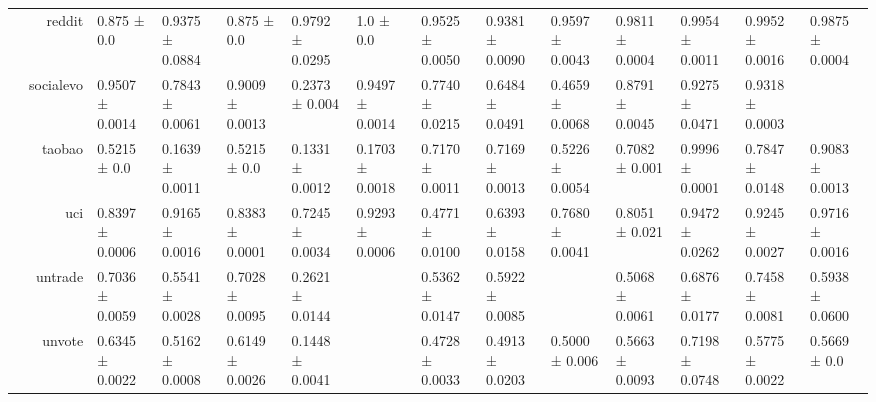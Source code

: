 {\begin{tabular}{@{}crllllllllllll@{}}
                                    & reddit               & 0.875 ± 0.0               & 0.9375 ± 0.0884            & 0.875 ± 0.0               & 0.9792 ± 0.0295            & \multicolumn{1}{l|}{1.0 ± 0.0}       & 0.9525 ± 0.0050           & 0.9381 ± 0.0090           & 0.9597 ± 0.0043          & 0.9811 ± 0.0004         & 0.9954 ± 0.0011         & 0.9952 ± 0.0016          & 0.9875 ± 0.0004            \\
                                    & socialevo            & 0.9507 ± 0.0014           & 0.7843 ± 0.0061            & 0.9009 ± 0.0013           & 0.2373 ± 0.004             & \multicolumn{1}{l|}{0.9497 ± 0.0014} & 0.7740 ± 0.0215           & 0.6484 ± 0.0491           & 0.4659 ± 0.0068          & 0.8791 ± 0.0045         & 0.9275 ± 0.0471         & 0.9318 ± 0.0003          &                            \\
                                    & taobao               & 0.5215 ± 0.0              & 0.1639 ± 0.0011            & 0.5215 ± 0.0              & 0.1331 ± 0.0012            & \multicolumn{1}{l|}{0.1703 ± 0.0018} & 0.7170 ± 0.0011           & 0.7169 ± 0.0013           & 0.5226 ± 0.0054          & 0.7082 ± 0.001          & 0.9996 ± 0.0001         & 0.7847 ± 0.0148          & 0.9083 ± 0.0013            \\
                                    & uci                  & 0.8397 ± 0.0006           & 0.9165 ± 0.0016            & 0.8383 ± 0.0001           & 0.7245 ± 0.0034            & \multicolumn{1}{l|}{0.9293 ± 0.0006} & 0.4771 ± 0.0100           & 0.6393 ± 0.0158           & 0.7680 ± 0.0041          & 0.8051 ± 0.021          & 0.9472 ± 0.0262         & 0.9245 ± 0.0027          & 0.9716 ± 0.0016            \\
                                    & untrade              & 0.7036 ± 0.0059           & 0.5541 ± 0.0028            & 0.7028 ± 0.0095           & 0.2621 ± 0.0144            & \multicolumn{1}{l|}{}                & 0.5362 ± 0.0147           & 0.5922 ± 0.0085           &                          & 0.5068 ± 0.0061         & 0.6876 ± 0.0177         & 0.7458 ± 0.0081          & 0.5938 ± 0.0600            \\
                                    & unvote               & 0.6345 ± 0.0022           & 0.5162 ± 0.0008            & 0.6149 ± 0.0026           & 0.1448 ± 0.0041            & \multicolumn{1}{l|}{}                & 0.4728 ± 0.0033           & 0.4913 ± 0.0203           & 0.5000 ± 0.006           & 0.5663 ± 0.0093         & 0.7198 ± 0.0748         & 0.5775 ± 0.0022          & 0.5669 ± 0.0               \\

\end{tabular}}
